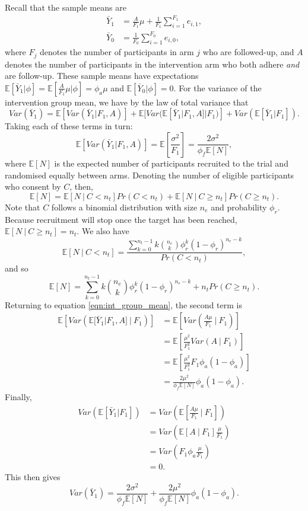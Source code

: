 \documentclass{article}
\begin{document}
Recall that the sample means are
\begin{align*}
\bar{Y}_1 &= \frac{A}{F_1}\mu + \frac{1}{F_1} \sum_{i=1}^{F_1} e_{i,1}, \\
\bar{Y}_0 &= \frac{1}{F_0}\sum_{i=1}^{F_0} e_{i,0},
\end{align*}
where $F_j$ denotes the number of participants in arm $j$ who are followed-up, and $A$ denotes the number of participants in the intervention arm who both adhere \emph{and} are follow-up. These sample means have expectations $\mathbb{E}[\bar{Y}_1 | \phi] = \mathbb{E}[\frac{A}{F_1}\mu | \phi] = \phi_a \mu$ and $\mathbb{E}[\bar{Y}_0 | \phi] = 0$. For the variance of the intervention group mean, we have by the law of total variance that
\begin{equation}\label{eqn:int_group_mean}
Var(\bar{Y}_1) = \mathbb{E}[Var(\bar{Y}_1 | F_1, A)] + 
\mathbb{E}[Var(\mathbb{E}[\bar{Y}_1 | F_1, A] | F_1)] + 
Var(\mathbb{E}[\bar{Y}_1 | F_1]).
\end{equation}
Taking each of these terms in turn:
$$
\mathbb{E}[Var(\bar{Y}_1 | F_1, A)] = \mathbb{E} \left[ \frac{\sigma^2}{F_1} \right] = \frac{2\sigma^2}{\phi_f \mathbb{E}[N]},
$$
where $\mathbb{E}[N]$ is the expected number of participants recruited to the trial and randomised equally between arms. Denoting the number of eligible participants who consent by $C$, then,
$$
\mathbb{E}[N] = \mathbb{E}[N ~|~ C < n_t] Pr(C < n_t) + \mathbb{E}[N ~|~ C \geq n_t] Pr(C \geq n_t).
$$
Note that $C$ follows a binomial distribution with size $n_e$ and probability $\phi_r$. Because recruitment will stop once the target has been reached, $\mathbb{E}[N ~|~ C \geq n_t] = n_t$. We also have
$$
\mathbb{E}[N ~|~ C < n_t] = \frac{\sum_{k=0}^{n_t-1} k{n_e \choose k} \phi_r^k (1-\phi_r)^{n_e - k} } {Pr(C < n_t)},
$$
and so 
$$
\mathbb{E}[N] = \sum_{k=0}^{n_t-1} k{n_e \choose k} \phi_r^k (1-\phi_r)^{n_e - k} + n_t Pr(C \geq n_t).
$$
Returning to equation \ref{eqn:int_group_mean}, the second term is 
\begin{align*}
\mathbb{E} \left[ Var(\mathbb{E}[\bar{Y}_1 | F_1, A] ~|~ F_1) \right] &= \mathbb{E} \left[ Var \left(\frac{A\mu}{F_1} ~|~ F_1 \right) \right] \\
&= \mathbb{E} \left[\frac{\mu^2}{F_1^2} Var(A ~|~ F_1) \right] \\
&= \mathbb{E} \left[ \frac{\mu^2}{F_1^2} F_1 \phi_a (1-\phi_a) \right] \\
&= \frac{2\mu^2}{\phi_f \mathbb{E}[N]} \phi_a (1-\phi_a).
\end{align*}
Finally,
\begin{align*}
Var(\mathbb{E}[\bar{Y}_1 | F_1]) &= Var \left( \mathbb{E} \left[ \frac{A \mu}{F_1} ~|~ F_1 \right] \right) \\
&= Var \left( \mathbb{E} \left[ A ~|~ F_1 \right] \frac{\mu}{F_1} \right) \\
&= Var \left( F_1 \phi_a \frac{\mu}{F_1} \right) \\
&= 0.
\end{align*}
This then gives
$$
Var(\bar{Y}_1) = \frac{2\sigma^2}{\phi_f \mathbb{E}[N]} + \frac{2\mu^2}{\phi_f \mathbb{E}[N]} \phi_a (1-\phi_a).
$$
\end{document}
